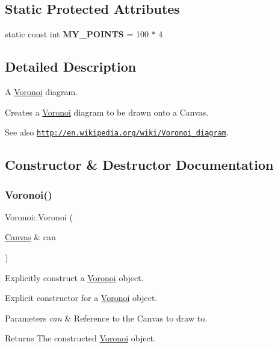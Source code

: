 \subsection*{Static Protected Attributes}
\begin{DoxyCompactItemize}
\item 
\mbox{\label{class_voronoi_a7cd943a1115b55c87ecc9d50ad351885}} 
static const int {\bfseries M\+Y\+\_\+\+P\+O\+I\+N\+TS} = 100 $\ast$ 4
\end{DoxyCompactItemize}


\subsection{Detailed Description}
A \hyperlink{class_voronoi}{Voronoi} diagram. 

Creates a \hyperlink{class_voronoi}{Voronoi} diagram to be drawn onto a Canvas. \begin{DoxySeeAlso}{See also}
\href{http://en.wikipedia.org/wiki/Voronoi_diagram}{\tt http\+://en.\+wikipedia.\+org/wiki/\+Voronoi\+\_\+diagram}. 
\end{DoxySeeAlso}


\subsection{Constructor \& Destructor Documentation}
\mbox{\label{class_voronoi_a09fc8a28d40e4e7f5abda0ec25e8785d}} 
\subsubsection{\texorpdfstring{Voronoi()}{Voronoi()}}
{\footnotesize\ttfamily Voronoi\+::\+Voronoi (\begin{DoxyParamCaption}\item[{\hyperlink{classtsgl_1_1_canvas}{Canvas} \&}]{can }\end{DoxyParamCaption})}



Explicitly construct a \hyperlink{class_voronoi}{Voronoi} object. 

Explicit constructor for a \hyperlink{class_voronoi}{Voronoi} object. 
\begin{DoxyParams}{Parameters}
{\em can} & Reference to the Canvas to draw to. \\
\hline
\end{DoxyParams}
\begin{DoxyReturn}{Returns}
The constructed \hyperlink{class_voronoi}{Voronoi} object. 
\end{DoxyReturn}
\mbox{\label{class_voronoi_a9f4428492a0608030343ffbd4bb8d9ae}} 
